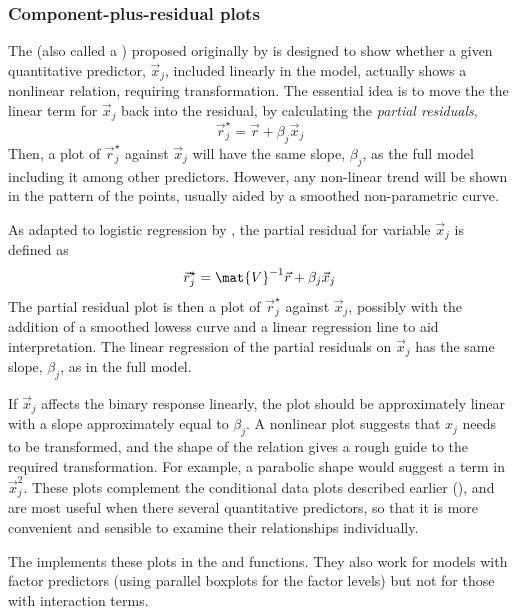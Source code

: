 \documentclass[11pt]{book}
\begin{document}
\subsubsection{Component-plus-residual plots}\label{sec:component-plus-residual}
The 
(also called a )
proposed originally by 
\citet{LarsenMcCleary:72} is designed to
show whether a given quantitative predictor, $\vec{x}_j$, included linearly in the model,
actually shows a nonlinear relation, requiring transformation.
The essential idea is to move the the linear term for $\vec{x}_j$ back into
the residual, by calculating the \emph{partial residuals},
\begin{equation*}
\vec{r}_j^{\star} = \vec{r} + \beta_j \vec{x}_j
\end{equation*}
Then, a plot of $\vec{r}_j^{\star}$ against $\vec{x}_j$ will have the same slope,
$\beta_j$, as the full model including it among other predictors.
However, any non-linear trend will be shown in the pattern of the points,
usually aided by a smoothed non-parametric curve.

As adapted to logistic regression by \citet{Landwehr-etal:84},
the partial residual for variable $\vec{x}_j$ is defined as
\begin{equation*}%
\vec{r}_j^{\star} = \mat{V}^{-1} \vec{r} + \beta_j \vec{x}_j
\end{equation*}
The partial residual plot is then a plot of $\vec{r}_j^{\star}$ against
$\vec{x}_j$, possibly with the addition of a smoothed lowess curve
\citep{Fowlkes:87} and
a linear regression line to aid interpretation. The linear regression
of the partial residuals on $\vec{x}_j$
has the same slope, $\beta_j$, as in the full model.

If $\vec{x}_j$ affects the binary response linearly, the plot should be approximately linear with a slope approximately equal to $\beta_j$.
A nonlinear plot suggests that $x_j$ needs to be transformed, and
the shape of the relation gives a rough guide to the required
transformation.
For example, a parabolic shape would suggest a term in $\vec{x}_j^2$.
These plots complement the conditional data plots described earlier
(), and are most useful when there several quantitative predictors,
so that it is more convenient and sensible to examine their relationships individually.

The  implements these plots in the 
and  functions. They also work for models with
factor predictors (using parallel boxplots for the factor levels) but not for those with interaction terms.  
\end{document}
